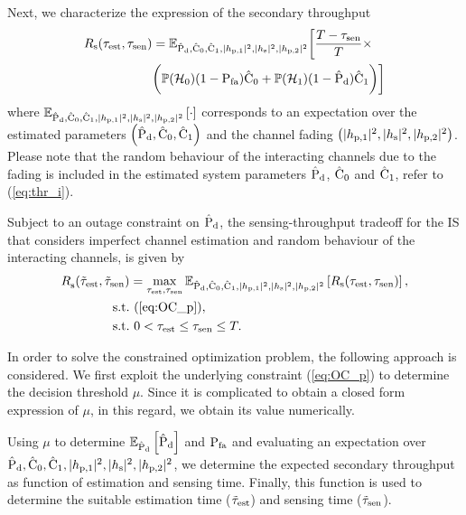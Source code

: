 Next, we characterize the expression of the secondary throughput 
\begin{align}
\rs(\test, \tsen) &= \mathbb{E}_{\epd,\ecz,\eco,\phpo, \phs, \phpt} \bigg[ \frac{T - \tsen}{T} \times \nonumber \\ & \bigg( \phz (1 - \pfa) \ecz + \pho (1 -\epd) \eco \bigg) \bigg] \label{eq:thr_p}
\end{align}
where ${\mathbb E}_{\hat{\text{P}}_{\text{d}},\hat{\text{C}}_0,\hat{\text{C}}_1,|h_{\text{p,1}}|^2, |h_{\text{s}}|^2, |h_{\text{p,2}}|^2}\left[ \cdot \right]$ corresponds to an expectation over the estimated parameters $\left( \hat{\text{P}}_{\text{d}}, \hat{\text{C}}_0, \hat{\text{C}}_1 \right)$ and the channel fading $\left( |h_{\text{p,1}}|^2, |h_{\text{s}}|^2, |h_{\text{p,2}}|^2 \right)$. Please note that the random behaviour of the interacting channels due to the fading is included in the estimated system parameters $\hat{\text{P}}_{\text{d}}$, $\hat{\text{C}}_0$ and $\hat{\text{C}}_1$, refer to (\ref{eq:thr_i}).

\begin{theorem} \label{th:th2}
\normalfont
Subject to an outage constraint on $\hat{\text{P}}_{\text{d}}$, the sensing-throughput tradeoff for the IS that considers imperfect channel estimation and random behaviour of the interacting channels, is given by  
\begin{align}
{R}_{\text{s}}^{\text{}}(\tilde{\tau}_{\text{est}}, \tilde{\tau}_{\text{sen}}) &= \operatorname*{max}_{\tau_{\text{est}}, \tau_{\text{sen}}} {\mathbb E}_{\hat{\text{P}}_{\text{d}}, \hat{\text{C}}_0, \hat{\text{C}}_1, |h_{\text{p,1}}|^2, |h_{\text{s}}|^2, |h_{\text{p,2}}|^2}\left[ R_{\text{s}}(\tau_{\text{est}}, \tau_{\text{sen}}) \right], \nonumber \\ 
\text{s.t.} & \text{ }  (\ref{eq:OC_p}),  \\
\text{s.t.} & \text{ }  0 < \tau_{\text{est}} \le \tau_{\text{sen}} \le T. \nonumber
\end{align}
\end{theorem} 

\begin{IEEEproof} 
In order to solve the constrained optimization problem, the following approach is considered. We first exploit the underlying constraint (\ref{eq:OC_p}) to determine the decision threshold $\mu$. Since it is complicated to obtain a closed form expression of $\mu$, in this regard, we obtain its value numerically. 

Using $\mu$ to determine ${\mathbb E}_{\hat{\text{P}}_{\text{d}}}\left[ \hat{\text{P}}_{\text{d}} \right]$ and $\text{P}_{\text{fa}}$ and evaluating an expectation over $\hat{\text{P}}_{\text{d}}, \hat{\text{C}}_0, \hat{\text{C}}_1, |h_{\text{p,1}}|^2, |h_{\text{s}}|^2, |h_{\text{p,2}}|^2$, we determine the expected secondary throughput as function of estimation and sensing time. Finally, this function is used to determine the suitable estimation time ($\tilde{\tau}_{\text{est}}$) and sensing time ($\tilde{\tau}_{\text{sen}}$).
\end{IEEEproof} 


